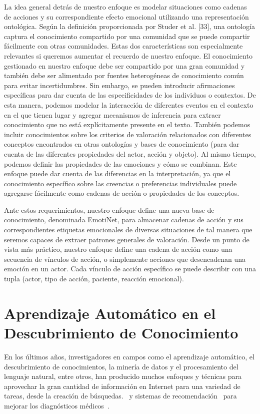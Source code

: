 La idea general detrás de nuestro enfoque es modelar situaciones como cadenas de acciones y su correspondiente efecto emocional utilizando una representación ontológica. Según la definición proporcionada por Studer et al. [33], una ontología captura el conocimiento compartido por una comunidad que se puede compartir fácilmente con otras comunidades. Estas dos características son especialmente relevantes si queremos aumentar el recuerdo de nuestro enfoque. El conocimiento gestionado en nuestro enfoque debe ser compartido por una gran comunidad y también debe ser alimentado por fuentes heterogéneas de conocimiento común para evitar incertidumbres. Sin embargo, se pueden introducir afirmaciones específicas para dar cuenta de las especificidades de los individuos o contextos. De esta manera, podemos modelar la interacción de diferentes eventos en el contexto en el que tienen lugar y agregar mecanismos de inferencia para extraer conocimiento que no está explícitamente presente en el texto. También podemos incluir conocimientos sobre los criterios de valoración relacionados con diferentes conceptos encontrados en otras ontologías y bases de conocimiento (para dar cuenta de las diferentes propiedades del actor, acción y objeto). Al mismo tiempo, podemos definir las propiedades de las emociones y cómo se combinan. Este enfoque puede dar cuenta de las diferencias en la interpretación, ya que el conocimiento específico sobre las creencias o preferencias individuales puede agregarse fácilmente como cadenas de acción o propiedades de los conceptos.

Ante estos requerimientos, nuestro enfoque define una nueva base de conocimiento, denominada EmotiNet, para almacenar cadenas de acción y sus correspondientes etiquetas emocionales de diversas situaciones de tal manera que seremos capaces de extraer patrones generales de valoración. Desde un punto de vista más práctico, nuestro enfoque define una cadena de acción como una secuencia de vínculos de acción, o simplemente acciones que desencadenan una emoción en un actor. Cada vínculo de acción específico se puede describir con una tupla (actor, tipo de acción, paciente, reacción emocional).

\section{Aprendizaje Automático en el Descubrimiento de Conocimiento}\label{sec:sota-ml}

En los últimos años, investigadores en campos como el aprendizaje automático, el descubrimiento de conocimientos, la minería de datos y el procesamiento del lenguaje natural, entre otros, han producido muchos enfoques y técnicas para aprovechar la gran cantidad de información en Internet para una variedad de tareas, desde la creación de búsquedas.~\cite{google} y sistemas de recomendación~\cite{youtube} para mejorar los diagnósticos médicos~\cite{watson}.

